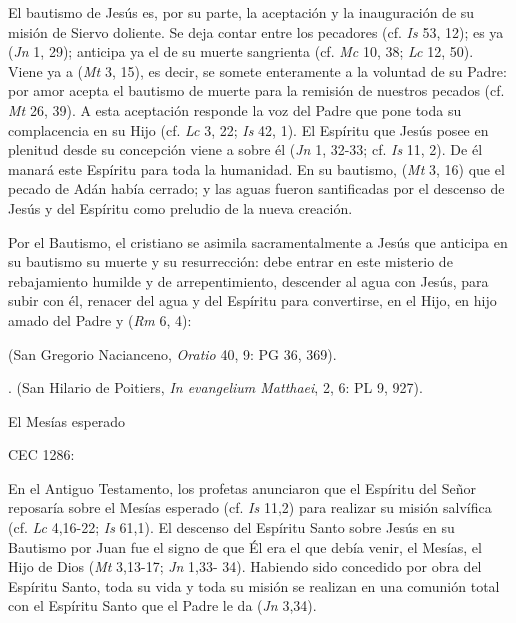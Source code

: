	 El bautismo de Jesús es, por su parte, la aceptación y la inauguración de su misión de Siervo doliente. Se deja contar entre los pecadores (cf. \emph{Is} 53, 12); es ya  (\emph{Jn} 1, 29); anticipa ya el  de su muerte sangrienta (cf. \emph{Mc} 10, 38; \emph{Lc} 12, 50). Viene ya a  (\emph{Mt} 3, 15), es decir, se somete enteramente a la voluntad de su Padre: por amor acepta el bautismo de muerte para la remisión de nuestros pecados (cf. \emph{Mt} 26, 39). A esta aceptación responde la voz del Padre que pone toda su complacencia en su Hijo (cf. \emph{Lc} 3, 22; \emph{Is} 42, 1). El Espíritu que Jesús posee en plenitud desde su concepción viene a  sobre él (\emph{Jn} 1, 32-33; cf. \emph{Is} 11, 2). De él manará este Espíritu para toda la humanidad. En su bautismo,  (\emph{Mt} 3, 16) que el pecado de Adán había cerrado; y las aguas fueron santificadas por el descenso de Jesús y del Espíritu como preludio de la nueva creación.
	
	 Por el Bautismo, el cristiano se asimila sacramentalmente a Jesús que anticipa en su bautismo su muerte y su resurrección: debe entrar en este misterio de rebajamiento humilde y de arrepentimiento, descender al agua con Jesús, para subir con él, renacer del agua y del Espíritu para convertirse, en el Hijo, en hijo amado del Padre y  (\emph{Rm} 6, 4):
	
	 (San Gregorio Nacianceno, \emph{Oratio} 40, 9: PG 36, 369).
	
	. (San Hilario de Poitiers, \emph{In evangelium Matthaei}, 2, 6: PL 9, 927).
	
	El Mesías esperado
	
	CEC 1286:
	
	 En el Antiguo Testamento, los profetas anunciaron que el Espíritu del Señor reposaría sobre el Mesías esperado (cf. \emph{Is} 11,2) para realizar su misión salvífica (cf. \emph{Lc} 4,16-22; \emph{Is} 61,1). El descenso del Espíritu Santo sobre Jesús en su Bautismo por Juan fue el signo de que Él era el que debía venir, el Mesías, el Hijo de Dios (\emph{Mt} 3,13-17; \emph{Jn} 1,33- 34). Habiendo sido concedido por obra del Espíritu Santo, toda su vida y toda su misión se realizan en una comunión total con el Espíritu Santo que el Padre le da  (\emph{Jn} 3,34).
	
